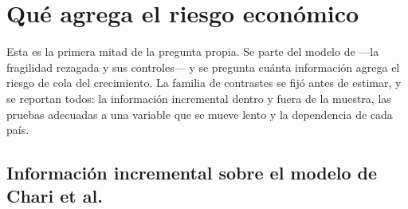 \section{Qué agrega el riesgo económico}
\label{sec:aporte-cola}

Esta es la primera mitad de la pregunta propia. Se parte del modelo de \citet{Chari2024b} ---la fragilidad rezagada y sus controles--- y se pregunta cuánta información agrega el riesgo de cola del crecimiento. La familia de contrastes se fijó antes de estimar, y se reportan todos: la información incremental dentro y fuera de la muestra, las pruebas adecuadas a una variable que se mueve lento y la dependencia de cada país.

\subsection{Información incremental sobre el modelo de Chari et al.}

